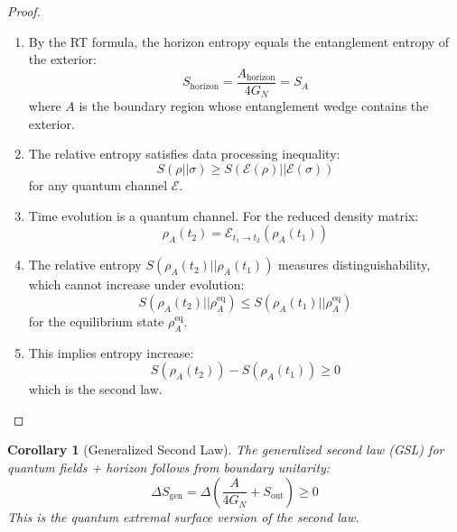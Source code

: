 \documentclass[12pt,a4paper]{article}
\newtheorem{corollary}[theorem]{Corollary}
\begin{document}
\begin{proof}
\begin{enumerate}
    \item By the RT formula, the horizon entropy equals the entanglement entropy of the exterior:
    \begin{equation}
    S_{\text{horizon}} = \frac{A_{\text{horizon}}}{4G_N} = S_A
    \end{equation}
    where $A$ is the boundary region whose entanglement wedge contains the exterior.
    
    \item The relative entropy satisfies data processing inequality:
    \begin{equation}
    S(\rho || \sigma) \geq S(\mathcal{E}(\rho) || \mathcal{E}(\sigma))
    \end{equation}
    for any quantum channel $\mathcal{E}$.
    
    \item Time evolution is a quantum channel. For the reduced density matrix:
    \begin{equation}
    \rho_A(t_2) = \mathcal{E}_{t_1 \to t_2}(\rho_A(t_1))
    \end{equation}
    
    \item The relative entropy $S(\rho_A(t_2) || \rho_A(t_1))$ measures distinguishability, which cannot increase under evolution:
    \begin{equation}
    S(\rho_A(t_2) || \rho_A^{\text{eq}}) \leq S(\rho_A(t_1) || \rho_A^{\text{eq}})
    \end{equation}
    for the equilibrium state $\rho_A^{\text{eq}}$.
    
    \item This implies entropy increase:
    \begin{equation}
    S(\rho_A(t_2)) - S(\rho_A(t_1)) \geq 0
    \end{equation}
    which is the second law.
\end{enumerate}
\end{proof}

\begin{corollary}[Generalized Second Law]
The generalized second law (GSL) for quantum fields + horizon follows from boundary unitarity:
\begin{equation}
\Delta S_{\text{gen}} = \Delta\left( \frac{A}{4G_N} + S_{\text{out}} \right) \geq 0
\end{equation}
This is the quantum extremal surface version of the second law.
\end{corollary}
\end{document}
